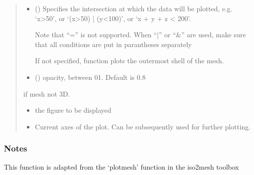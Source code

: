 \documentclass[letterpaper,10pt,english]{sphinxmanual}
\begin{document}
\begin{fulllineitems}
\begin{quote}
\begin{description}
\begin{itemize}
\item {} 
\sphinxAtStartPar
{} (\sphinxstyleliteralemphasis{\sphinxupquote{, }}) \textendash{} 
\sphinxAtStartPar
Specifies the intersection at which the data will be plotted, e.g. ‘x\textgreater{}50’, or ‘(x\textgreater{}50) | (y\textless{}100)’, or ‘x + y + z \textless{} 200’.

\sphinxAtStartPar
Note that “=” is not supported. When “|” or “\&” are used, make sure that all conditions are put in parantheses separately

\sphinxAtStartPar
If not specified, function plots the outermost shell of the mesh.


\item {} 
\sphinxAtStartPar
{} (\sphinxstyleliteralemphasis{\sphinxupquote{, }}) \textendash{} opacity, between 0\sphinxhyphen{}1. Default is 0.8

\end{itemize}

\sphinxAtStartPar
{} \textendash{} if mesh not 3D.

\sphinxAtStartPar
\begin{itemize}
\item {} 
\sphinxAtStartPar
{} \textendash{} the figure to be displayed

\item {} 
\sphinxAtStartPar
{} \textendash{} Current axes of the plot. Can be subsequently used for further plotting.

\end{itemize}


\end{description}\end{quote}
\subsubsection*{Notes}

\sphinxAtStartPar
This function is adapted from the ‘plotmesh’ function in the iso2mesh toolbox

\sphinxAtStartPar
{}

\end{fulllineitems}
\end{document}
